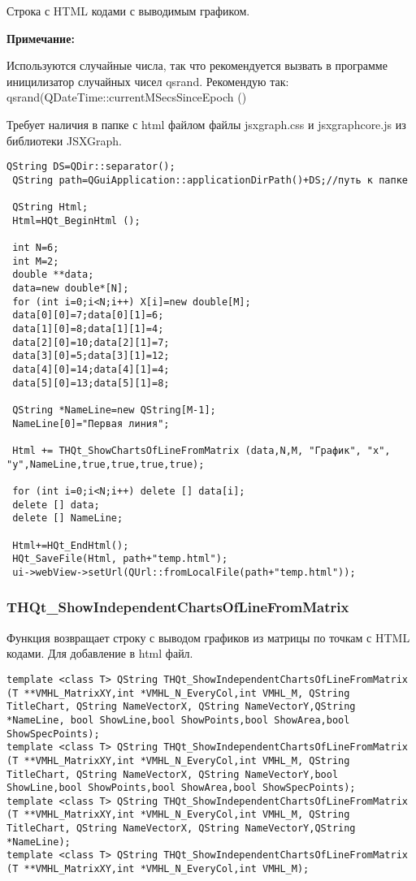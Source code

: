 \documentclass[a4paper,12pt]{article}
\begin{document}
Строка с HTML кодами с выводимым графиком.

\textbf{Примечание:}

Используются случайные числа, так что рекомендуется вызвать в программе иницилизатор случайных чисел qsrand. Рекомендую так: qsrand(QDateTime::currentMSecsSinceEpoch () %

Требует наличия в папке с html файлом файлы jsxgraph.css и jsxgraphcore.js из библиотеки JSXGraph.


\begin{lstlisting}[label=code_use_THQt_ShowChartsOfLineFromMatrix,caption=Пример использования]
QString DS=QDir::separator();
 QString path=QGuiApplication::applicationDirPath()+DS;//путь к папке

 QString Html;
 Html=HQt_BeginHtml ();

 int N=6;
 int M=2;
 double **data;
 data=new double*[N];
 for (int i=0;i<N;i++) X[i]=new double[M];
 data[0][0]=7;data[0][1]=6;
 data[1][0]=8;data[1][1]=4;
 data[2][0]=10;data[2][1]=7;
 data[3][0]=5;data[3][1]=12;
 data[4][0]=14;data[4][1]=4;
 data[5][0]=13;data[5][1]=8;

 QString *NameLine=new QString[M-1];
 NameLine[0]="Первая линия";

 Html += THQt_ShowChartsOfLineFromMatrix (data,N,M, "График", "x", "y",NameLine,true,true,true,true);

 for (int i=0;i<N;i++) delete [] data[i];
 delete [] data;
 delete [] NameLine;

 Html+=HQt_EndHtml();
 HQt_SaveFile(Html, path+"temp.html");
 ui->webView->setUrl(QUrl::fromLocalFile(path+"temp.html"));
\end{lstlisting}

\subsubsection{THQt\_ShowIndependentChartsOfLineFromMatrix}\label{THQt_ShowIndependentChartsOfLineFromMatrix}

Функция возвращает строку с выводом графиков из матрицы по точкам с HTML кодами. Для добавление в html файл.


\begin{lstlisting}[label=code_syntax_THQt_ShowIndependentChartsOfLineFromMatrix,caption=Синтаксис]
template <class T> QString THQt_ShowIndependentChartsOfLineFromMatrix (T **VMHL_MatrixXY,int *VMHL_N_EveryCol,int VMHL_M, QString TitleChart, QString NameVectorX, QString NameVectorY,QString *NameLine, bool ShowLine,bool ShowPoints,bool ShowArea,bool ShowSpecPoints);
template <class T> QString THQt_ShowIndependentChartsOfLineFromMatrix (T **VMHL_MatrixXY,int *VMHL_N_EveryCol,int VMHL_M, QString TitleChart, QString NameVectorX, QString NameVectorY,bool ShowLine,bool ShowPoints,bool ShowArea,bool ShowSpecPoints);
template <class T> QString THQt_ShowIndependentChartsOfLineFromMatrix (T **VMHL_MatrixXY,int *VMHL_N_EveryCol,int VMHL_M, QString TitleChart, QString NameVectorX, QString NameVectorY,QString *NameLine);
template <class T> QString THQt_ShowIndependentChartsOfLineFromMatrix (T **VMHL_MatrixXY,int *VMHL_N_EveryCol,int VMHL_M);
\end{lstlisting}
\end{document}
